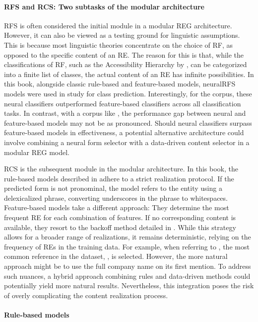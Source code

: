 \paragraph*{RFS and RCS: Two subtasks of the modular architecture}
RFS is often considered the initial module in a modular REG architecture. However, it can also be viewed as a testing ground for linguistic assumptions. This is because most linguistic theories concentrate on the choice of RF, as opposed to the specific content of an RE. The reason for this is that, while the classifications of RF, such as the Accessibility Hierarchy by \citet{ariel2001accessibility}, can be categorized into a finite list of classes, the actual content of an RE has infinite possibilities. In this book, alongside classic rule-based and feature-based models, neuralRFS models were used in study \studG for class prediction. Interestingly, for the \webnlg corpus, these neural classifiers outperformed feature-based classifiers across all classification tasks. In contrast, with a corpus like \wsj, the performance gap between neural and feature-based models may not be as pronounced. Should neural classifiers surpass feature-based models in effectiveness, a potential alternative architecture could involve combining a neural form selector with a data-driven content selector in a modular REG model.

RCS is the subsequent module in the modular architecture. In this book, the rule-based models described in  adhere to a strict realization protocol. If the predicted form is not pronominal, the model refers to the entity using a delexicalized phrase, converting underscores in the phrase to whitespaces. Feature-based models take a different approach: They determine the most frequent RE for each combination of features. If no corresponding content is available, they resort to the backoff method detailed in . While this strategy allows for a broader range of realizations, it remains deterministic, relying on the frequency of REs in the training data. For example, when referring to , the most common reference in the dataset, , is selected. However, the more natural approach might be to use the full company name on its first mention. To address such nuances, a hybrid approach combining rules and data-driven methods could potentially yield more natural results. Nevertheless, this integration poses the risk of overly complicating the content realization process.

\paragraph*{Rule-based models} 

